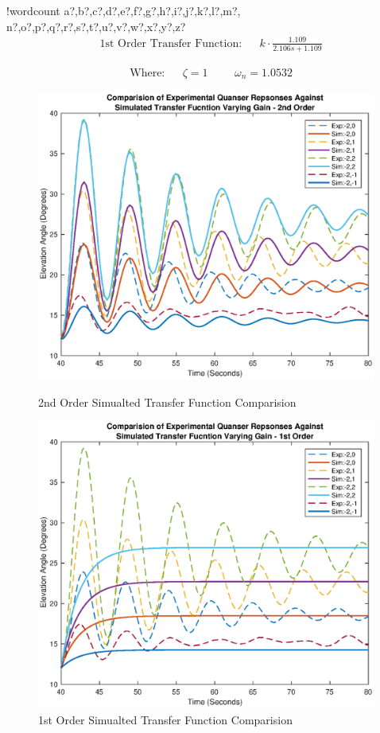 \documentclass[11pt]{article}
\newcounter{words}
\newenvironment{counted}{%
  \setcounter{words}{0}
  \SearchList!{wordcount}{\stepcounter{words}}
    {a?,b?,c?,d?,e?,f?,g?,h?,i?,j?,k?,l?,m?,
    n?,o?,p?,q?,r?,s?,t?,u?,v?,w?,x?,y?,z?}
  \UndoBoundary{'}
  \SearchOrder{p;}}{%
  \StopSearching}
\begin{document}
\begin{counted}
\begin{align}
&\text{1st Order Transfer Function}: && k \cdot \frac { 1.109 }{ 2.106s+1.109 }
\end{align}

\begin{align*}
&\text{Where:} &&\zeta = 1 &&& \omega_n = 1.0532
\end{align*}

\begin{figure}[H]
\centering
\begin{minipage}{.49\textwidth}
\centering
\includegraphics[trim = 35 16 35 0, clip, width=0.995\textwidth]{2ndTFcomp.eps}
\caption{2nd Order Simualted Transfer Function Comparision}
\label{2ndTFcomp}
\end{minipage}
\hfill
\begin{minipage}{.49\textwidth}
  \centering
  \includegraphics[trim = 35 16 35 0, clip, width=0.995\textwidth]{1stTFcomp.eps}
  \caption{1st Order Simualted Transfer Function Comparision}
  \label{1stTFcomp}
\end{minipage}
\vspace{-11pt}
\end{figure}


\end{counted}
\end{document}
